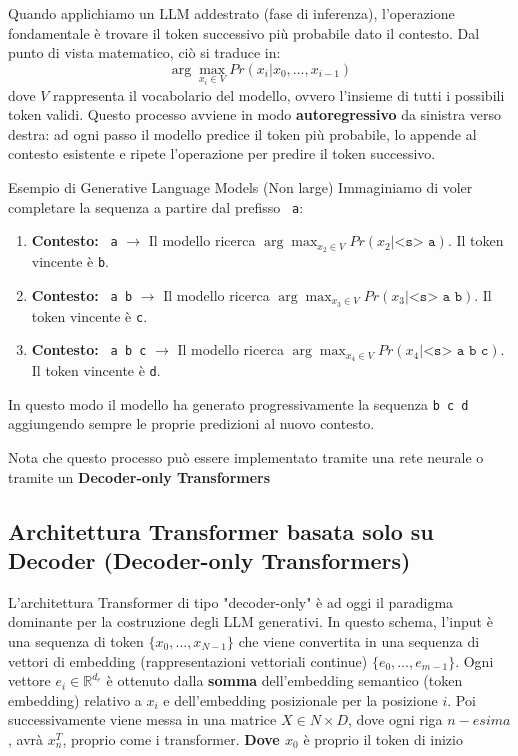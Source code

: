Quando applichiamo un LLM addestrato (fase di inferenza), l'operazione fondamentale è trovare il token successivo più probabile dato il contesto. Dal punto di vista matematico, ciò si traduce in:
\begin{equation}
\arg\max_{x_i \in V} Pr(x_i | x_0, \dots, x_{i-1})
\end{equation}
dove $V$ rappresenta il vocabolario del modello, ovvero l'insieme di tutti i possibili token validi.
Questo processo avviene in modo \textbf{autoregressivo} da sinistra verso destra: ad ogni passo il modello predice il token più probabile, lo appende al contesto esistente e ripete l'operazione per predire il token successivo.

\begin{example}{Esempio di Generative Language Models (Non large)}
Immaginiamo di voler completare la sequenza a partire dal prefisso \texttt{ a}:
\begin{enumerate}
\item \textbf{Contesto:} \texttt{ a} $\rightarrow$ Il modello ricerca $\arg\max_{x_2 \in V} Pr(x_2 \vert{} \texttt{<s> a})$. Il token vincente è \texttt{b}.
\item \textbf{Contesto:} \texttt{ a b} $\rightarrow$ Il modello ricerca $\arg\max_{x_3 \in V} Pr(x_3 \vert{} \texttt{<s> a b})$. Il token vincente è \texttt{c}.
\item \textbf{Contesto:} \texttt{ a b c} $\rightarrow$ Il modello ricerca $\arg\max_{x_4 \in V} Pr(x_4 \vert{} \texttt{<s> a b c})$. Il token vincente è \texttt{d}.
\end{enumerate}
In questo modo il modello ha generato progressivamente la sequenza \texttt{b c d} aggiungendo sempre le proprie predizioni al nuovo contesto.

Nota che questo processo può essere implementato tramite una rete neurale o tramite un \textbf{Decoder-only Transformers}
\end{example}

\subsection{Architettura Transformer basata solo su Decoder (Decoder-only Transformers)}

L'architettura Transformer di tipo "decoder-only" è ad oggi il paradigma dominante per la costruzione degli LLM generativi.
In questo schema, l'input è una sequenza di token $\{x_0, \dots, x_{N-1}\}$ che viene convertita in una sequenza di vettori di embedding (rappresentazioni vettoriali continue) $\{e_0, \dots, e_{m-1}\}$.
Ogni vettore $e_i \in \mathbb{R}^{d_e}$ è ottenuto dalla \textbf{somma} dell'embedding semantico (token embedding) relativo a $x_i$ e dell'embedding posizionale per la posizione $i$.
Poi successivamente viene messa in una matrice $X \in N \times D$, dove ogni riga $n-esima$, avrà $x_n^T$, proprio come i transformer. \textbf{Dove $x_0$} è proprio il token di inizio

